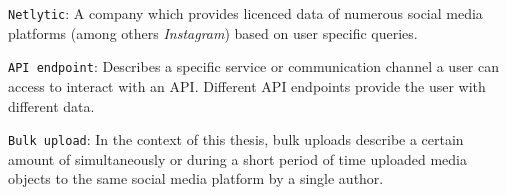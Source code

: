 \texttt{Netlytic}: A company which provides licenced data of numerous social media platforms (among others \textit{Instagram}) based on user specific queries.\newline

\texttt{API endpoint}: Describes a specific service or communication channel a user can access to interact with an API. Different API endpoints provide the user with different data.\newline

\texttt{Bulk upload}: In the context of this thesis, bulk uploads describe a certain amount of simultaneously or during a short period of time uploaded media objects to the same social media platform by a single author.\newline




 \cleardoublepage

